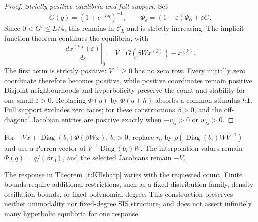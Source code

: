 \begin{proof}
\emph{Strictly positive equilibria and full support.}
Set
\[
 G(q)=(1+e^{-Lq})^{-1},\qquad
 \Phi_\varepsilon=(1-\varepsilon)\Phi_0+\varepsilon G.
\]
Since $0<G'\le L/4$, this remains in $\mathcal C_L$ and is strictly
increasing. The implicit-function theorem continues the equilibria, with
\[
 \left.\frac{d x^{(k)}(\varepsilon)}{d\varepsilon}\right|_0
 =V^{-1}G(\beta Wx^{(k)})-x^{(k)}.
\]
The first term is strictly positive: $V^{-1}\ge0$ has no zero row.
Every initially zero coordinate therefore becomes positive, while
positive coordinates remain positive. Disjoint neighbourhoods and
hyperbolicity preserve the count and stability for one small
$\varepsilon>0$. Replacing $\Phi(q)$ by $\Phi(q+h)$ absorbs a common stimulus
$h\mathbf1$. Full support excludes zero faces; for these constructions $\beta>0$,
and the off-diagonal Jacobian entries are positive exactly when $-v_{ij}>0$ or $w_{ij}>0$.
\end{proof}

\label{r:KBcountscope}
For $-Vx+\operatorname{Diag}(b_i)\Phi(\beta Wx)$, $b_i>0$, replace $r_0$
by $\rho(\operatorname{Diag}(b_i)WV^{-1})$ and use a Perron vector of
$V^{-1}\operatorname{Diag}(b_i)W$. The interpolation values remain
$\Phi(q)=q/(\beta r_0)$, and the selected Jacobians remain $-V$.


The response in Theorem~\ref{t:KBsharp} varies with the requested count. Finite bounds require
additional restrictions, such as a fixed distribution family, density
oscillation bounds, or fixed polynomial degree. This construction
preserves neither unimodality nor fixed-degree SIS structure, and does
not assert infinitely many hyperbolic equilibria for one response.
\eeR

